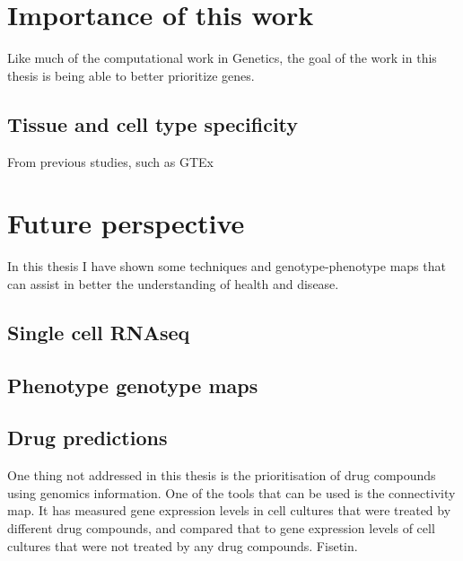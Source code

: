 \section{Importance of this work}
Like much of the computational work in Genetics, the goal of the work in this thesis is being able to better prioritize genes.

\subsection{Tissue and cell type specificity}
From previous studies, such as GTEx\cite{lonsdaleGenotypeTissueExpressionGTEx2013}

\section{Future perspective}
In this thesis I have shown some techniques and genotype-phenotype maps that can assist in better the understanding of health and disease. 

\subsection{Single cell RNAseq}
\subsection{Phenotype genotype maps}
\subsection{Drug predictions}
One thing not addressed in this thesis is the prioritisation of drug compounds using genomics information. One of the tools that can be used is the connectivity map\cite{lambConnectivityMapUsing2006}. It has measured gene expression levels in cell cultures that were treated by different drug compounds, and compared that to gene expression levels of cell cultures that were not treated by any drug compounds. Fisetin\cite{gibbsHumanGenomeProject2020}. 